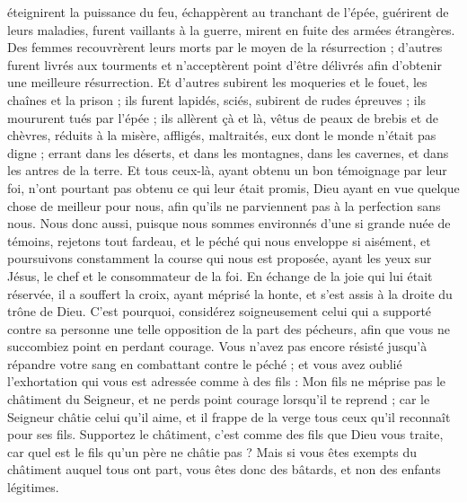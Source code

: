 \begin{multicols}{2}
éteignirent la puissance du feu, échappèrent au tranchant de l’épée, guérirent de leurs maladies, furent vaillants à la guerre, mirent en fuite des armées étrangères.
Des femmes recouvrèrent leurs morts par le moyen de la résurrection ; d'autres furent livrés aux tourments et n’acceptèrent point d'être délivrés afin d'obtenir une meilleure résurrection.
Et d'autres subirent les moqueries et le fouet, les chaînes et la prison ;
ils furent lapidés, sciés, subirent de rudes épreuves ; ils moururent tués par l'épée ; ils allèrent çà et là, vêtus de peaux de brebis et de chèvres, réduits à la misère, affligés, maltraités,
eux dont le monde n'était pas digne ; errant dans les déserts, et dans les montagnes, dans les cavernes, et dans les antres de la terre.
Et tous ceux-là, ayant obtenu un bon témoignage par leur foi, n'ont pourtant pas obtenu ce qui leur était promis,
Dieu ayant en vue quelque chose de meilleur pour nous, afin qu'ils ne parviennent pas à la perfection sans nous.
\VerseOne{}Nous donc aussi, puisque nous sommes environnés d'une si grande nuée de témoins, rejetons tout fardeau, et le péché qui nous enveloppe si aisément, et poursuivons constamment la course qui nous est proposée,
ayant les yeux sur Jésus, le chef et le consommateur de la foi. En échange de la joie qui lui était réservée, il a souffert la croix, ayant méprisé la honte, et s'est assis à la droite du trône de Dieu.
C'est pourquoi, considérez soigneusement celui qui a supporté contre sa personne une telle opposition de la part des pécheurs, afin que vous ne succombiez point en perdant courage.
Vous n'avez pas encore résisté jusqu'à répandre votre sang en combattant contre le péché ;
et vous avez oublié l'exhortation qui vous est adressée comme à des fils : Mon fils ne méprise pas le châtiment du Seigneur, et ne perds point courage lorsqu’il te reprend ;
car le Seigneur châtie celui qu'il aime, et il frappe de la verge tous ceux qu’il reconnaît pour ses fils.
Supportez le châtiment, c’est comme des fils que Dieu vous traite, car quel est le fils qu’un père ne châtie pas ?
Mais si vous êtes exempts du châtiment auquel tous ont part, vous êtes donc des bâtards, et non des enfants légitimes.

\end{multicols}
